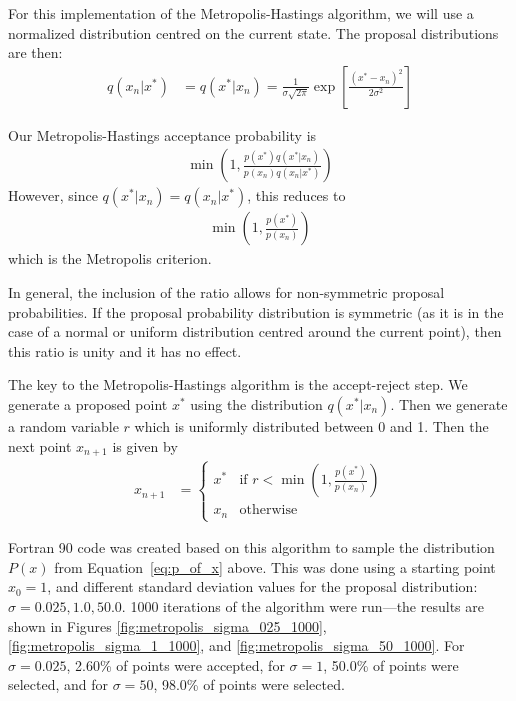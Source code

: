 \documentclass[twocolumn]{myarticle}
\begin{document}
For this implementation of the Metropolis-Hastings algorithm, we will use a normalized distribution centred on the current state.
The proposal distributions are then:
\begin{align}
    q\left(x_n | x^*\right) &= q\left(x^* | x_n\right) = \frac{1}{\sigma \sqrt{2\pi}} \exp \left[\frac{(x^* - x_n)^2}{2\sigma^2}\right]
\end{align}

Our Metropolis-Hastings acceptance probability is
\begin{align}
    \min \left( 1, \frac{p(x^*) q(x^*|x_n)}{p(x_n) q(x_n|x^*)} \right)
\end{align}
However, since $ q(x^*|x_n) = q(x_n|x^*) $, this reduces to
\begin{align}
    \min \left( 1, \frac{p(x^*)}{p(x_n)} \right)
\end{align}
which is the Metropolis criterion.

In general, the inclusion of the ratio allows for non-symmetric proposal probabilities.
If the proposal probability distribution is symmetric (as it is in the case of a normal or uniform distribution centred around the current point), then this ratio is unity and it has no effect.

The key to the Metropolis-Hastings algorithm is the accept-reject step.
We generate a proposed point $ x^* $ using the distribution $ q(x^* | x_n) $.
Then we generate a random variable $ r $ which is uniformly distributed between 0 and 1.
Then the next point $ x_{n+1} $ is given by
\begin{align}
    x_{n+1} &= \begin{cases} x^* & \text{if } r < \min \left( 1, \frac{p(x^*)}{p(x_n)} \right) \\ x_n & \text{otherwise} \end{cases}
\end{align}

Fortran 90 code was created based on this algorithm to sample the distribution $ P(x) $ from Equation~\eqref{eq:p_of_x} above.
This was done using a starting point $ x_0 = 1 $, and different standard deviation values for the proposal distribution: $ \sigma = 0.025, 1.0, 50.0 $.
1000 iterations of the algorithm were run---the results are shown in Figures \ref{fig:metropolis_sigma_025_1000}, \ref{fig:metropolis_sigma_1_1000}, and \ref{fig:metropolis_sigma_50_1000}.
For $ \sigma = 0.025 $, 2.60\% of points were accepted, for $ \sigma = 1 $, 50.0\% of points were selected, and for $ \sigma = 50 $, 98.0\% of points were selected.
\end{document}
